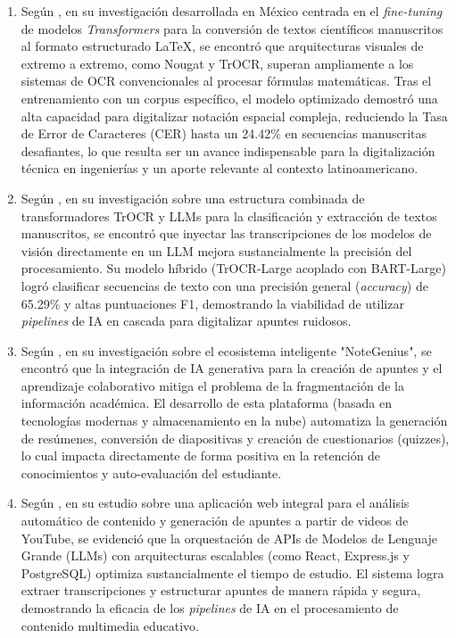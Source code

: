 \begin{enumerate}[label=\alph*)]
\item Según \textcite{AlvarezPerez2026}, en su investigación desarrollada en México centrada en el \textit{fine-tuning} de modelos \textit{Transformers} para la conversión de textos científicos manuscritos al formato estructurado LaTeX, se encontró que arquitecturas visuales de extremo a extremo, como Nougat y TrOCR, superan ampliamente a los sistemas de OCR convencionales al procesar fórmulas matemáticas. Tras el entrenamiento con un corpus específico, el modelo optimizado demostró una alta capacidad para digitalizar notación espacial compleja, reduciendo la Tasa de Error de Caracteres (CER) hasta un 24.42\% en secuencias manuscritas desafiantes, lo que resulta ser un avance indispensable para la digitalización técnica en ingenierías y un aporte relevante al contexto latinoamericano.

\item Según \textcite{KardanMoghaddam2025}, en su investigación sobre una estructura combinada de transformadores TrOCR y LLMs para la clasificación y extracción de textos manuscritos, se encontró que inyectar las transcripciones de los modelos de visión directamente en un LLM mejora sustancialmente la precisión del procesamiento. Su modelo híbrido (TrOCR-Large acoplado con BART-Large) logró clasificar secuencias de texto con una precisión general (\textit{accuracy}) de 65.29\% y altas puntuaciones F1, demostrando la viabilidad de utilizar \textit{pipelines} de IA en cascada para digitalizar apuntes ruidosos.

\item Según \textcite{Solanki2026}, en su investigación sobre el ecosistema inteligente "NoteGenius", se encontró que la integración de IA generativa para la creación de apuntes y el aprendizaje colaborativo mitiga el problema de la fragmentación de la información académica. El desarrollo de esta plataforma (basada en tecnologías modernas y almacenamiento en la nube) automatiza la generación de resúmenes, conversión de diapositivas y creación de cuestionarios (quizzes), lo cual impacta directamente de forma positiva en la retención de conocimientos y auto-evaluación del estudiante.

\item Según \textcite{Upadhyay2026}, en su estudio sobre una aplicación web integral para el análisis automático de contenido y generación de apuntes a partir de videos de YouTube, se evidenció que la orquestación de APIs de Modelos de Lenguaje Grande (LLMs) con arquitecturas escalables (como React, Express.js y PostgreSQL) optimiza sustancialmente el tiempo de estudio. El sistema logra extraer transcripciones y estructurar apuntes de manera rápida y segura, demostrando la eficacia de los \textit{pipelines} de IA en el procesamiento de contenido multimedia educativo.


\end{enumerate}
